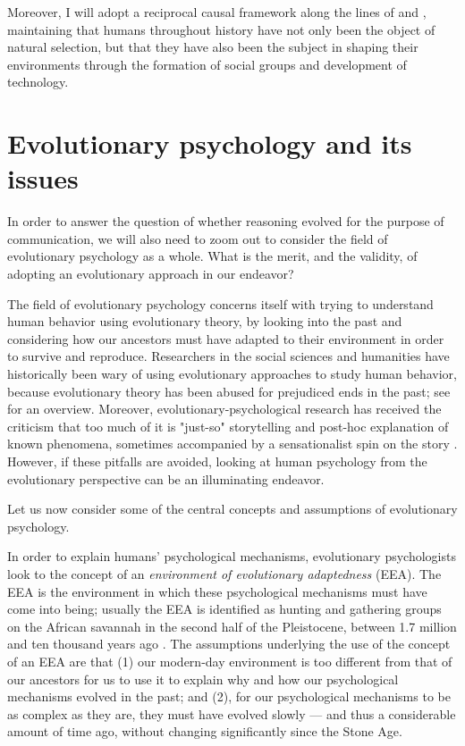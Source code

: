 Moreover, I will adopt a reciprocal causal framework along the lines of \citet{Laland13} and \citet{Svensson18}, maintaining that humans throughout history have not only been the object of natural selection, but that they have also been the subject in shaping their environments through the formation of social groups and development of technology.

\section{Evolutionary psychology and its issues}
\label{sec:evol-psych}
In order to answer the question of whether reasoning evolved for the purpose of communication, we will also need to zoom out to consider the field of evolutionary psychology as a whole. What is the merit, and the validity, of adopting an evolutionary approach in our endeavor?

The field of evolutionary psychology concerns itself with trying to understand human behavior using evolutionary theory, by looking into the past and considering how our ancestors must have adapted to their environment in order to survive and reproduce.
Researchers in the social sciences and humanities have historically been wary of using evolutionary approaches to study human behavior, because evolutionary theory has been abused for prejudiced ends in the past; see \citet[pp.~19--20]{LB02} for an overview. Moreover, evolutionary-psychological research has received the criticism that too much of it is "just-so" storytelling and post-hoc explanation of known phenomena, sometimes accompanied by a sensationalist spin on the story \citep{LB02}.
However, if these pitfalls are avoided, looking at human psychology from the evolutionary perspective can be an illuminating endeavor.

Let us now consider some of the central concepts and assumptions of evolutionary psychology.

In order to explain humans' psychological mechanisms, evolutionary psychologists look to the concept of an \emph{environment of evolutionary adaptedness} (EEA). The EEA is the environment in which these psychological mechanisms must have come into being; usually the EEA is identified as hunting and gathering groups on the African savannah in the second half of the Pleistocene, between 1.7 million and ten thousand years ago \citep{LB02} .
The assumptions underlying the use of the concept of an EEA are that (1) our modern-day environment is too different from that of our ancestors for us to use it to explain why and how our psychological mechanisms evolved in the past; and (2), for our psychological mechanisms to be as complex as they are, they must have evolved slowly --- and thus a considerable amount of time ago, without changing significantly since the Stone Age.

